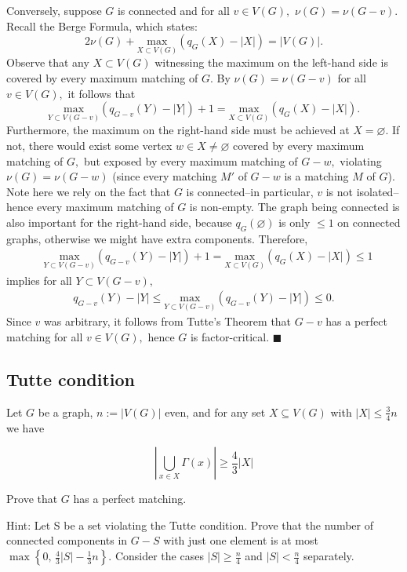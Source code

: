\documentclass{article}
\let\emptyset\varnothing
\begin{document}
Conversely, suppose $G$ is connected and for all $v\in V(G),$ $\nu(G)=\nu(G-v)$. Recall the Berge Formula, which states:
$$2\nu(G)+\underset{X\subset V(G)}{\text{max}}(q_G(X)-|X|)=|V(G)|.$$Observe that any $X\subset V(G)$ witnessing the maximum on the left-hand side is covered by every maximum matching of $G.$ By $\nu(G)=\nu(G-v)$ for all $v\in V(G),$ it follows that
$$\underset{Y\subset V(G-v)}{\text{max}}(q_{G-v}(Y)-|Y|)+1=\underset{X\subset V(G)}{\text{max}}(q_G(X)-|X|).$$Furthermore, the maximum on the right-hand side must be achieved at $X=\emptyset.$ If not, there would exist some vertex $w\in X\neq \emptyset$ covered by every maximum matching of $G,$ but exposed by every maximum matching of $G-w,$ violating $\nu(G)=\nu(G-w)$ (since every matching $M'$ of $G-w$ is a matching $M$ of $G$). Note here we rely on the fact that $G$ is connected--in particular, $v$ is not isolated--hence every maximum matching of $G$ is non-empty. The graph being connected is also important for the right-hand side, because $q_G(\emptyset)$ is only $\leq 1$ on connected graphs, otherwise we might have extra components. Therefore, \begin{align*} & \underset{Y\subset V(G-v)}{\text{max}}(q_{G-v}(Y)-|Y|)+1=\underset{X\subset V(G)}{\text{max}}(q_G(X)-|X|)\leq 1\end{align*}implies for all $Y\subset V(G-v),$
\begin{align*} q_{G-v}(Y)-|Y|\leq \underset{Y\subset V(G-v)}{\text{max}}(q_{G-v}(Y)-|Y|)\leq 0.\end{align*}Since $v$ was arbitrary, it follows from Tutte's Theorem that $G-v$ has a perfect matching for all $v\in V(G),$ hence $G$ is factor-critical. $\blacksquare$



  \subsection{Tutte condition}
  \begin{centerframebox}
    Let $G$ be a graph, $n := |V(G)|$ even, and for any set $ X \subseteq V(G)$
    with $|X| \leq \frac{3}{4}n$ we have

    \[ \left|\bigcup_{x \in X}\Gamma(x)\right| \geq \frac{4}{3}|X| \]

    Prove that $G$ has a perfect matching.

    Hint: Let S be a set violating the Tutte condition.
    Prove that the number of connected components in $G - S$ with just one element is at most
    $\max \left\{0,\, \frac{4}{3}|S| - \frac{1}{3}n \right\}$.
    Consider the cases $|S| \geq \frac{n}{4}$ and $|S| < \frac{n}{4}$ separately.

  \end{centerframebox}
\end{document}
